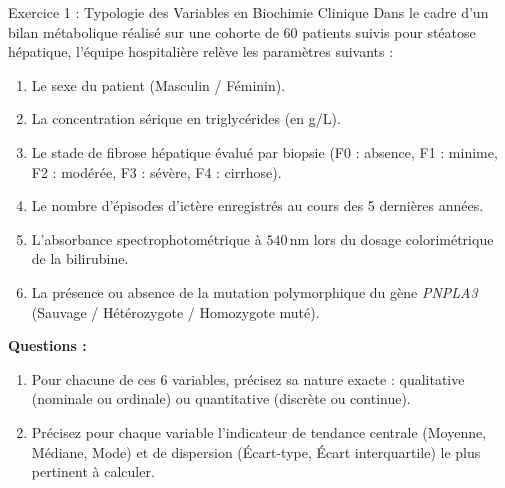 \documentclass[11pt,a4paper]{article}
\begin{document}

\begin{exercicebox}{Exercice 1 : Typologie des Variables en Biochimie Clinique}
Dans le cadre d'un bilan métabolique réalisé sur une cohorte de 60 patients suivis pour stéatose hépatique, l'équipe hospitalière relève les paramètres suivants :
\begin{enumerate}
  \item Le sexe du patient (Masculin / Féminin).
  \item La concentration sérique en triglycérides (en g/L).
  \item Le stade de fibrose hépatique évalué par biopsie (F0 : absence, F1 : minime, F2 : modérée, F3 : sévère, F4 : cirrhose).
  \item Le nombre d'épisodes d'ictère enregistrés au cours des 5 dernières années.
  \item L'absorbance spectrophotométrique à $540\,\text{nm}$ lors du dosage colorimétrique de la bilirubine.
  \item La présence ou absence de la mutation polymorphique du gène \textit{PNPLA3} (Sauvage / Hétérozygote / Homozygote muté).
\end{enumerate}

\textbf{Questions :}
\begin{enumerate}[label=\textbf{\alph*.}]
  \item Pour chacune de ces 6 variables, précisez sa nature exacte : qualitative (nominale ou ordinale) ou quantitative (discrète ou continue).
  \item Précisez pour chaque variable l'indicateur de tendance centrale (Moyenne, Médiane, Mode) et de dispersion (Écart-type, Écart interquartile) le plus pertinent à calculer.
\end{enumerate}
\end{exercicebox}
\end{document}
